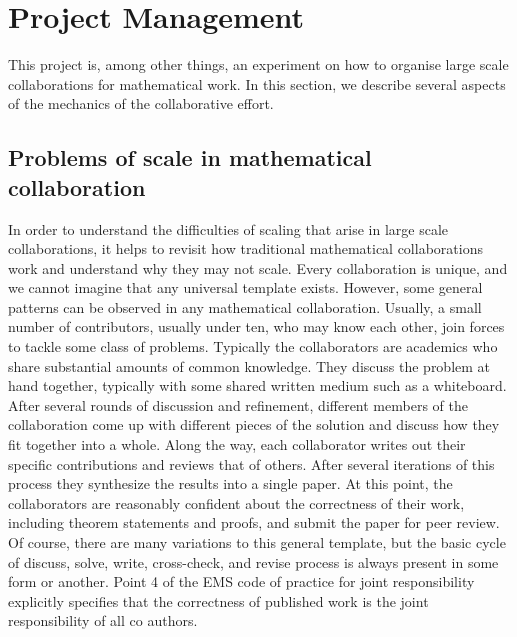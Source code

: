 \section{Project Management}\label{project-sec}


This project is, among other things, an experiment on how to organise large scale collaborations for mathematical work. In this section, we describe several aspects of the mechanics of the collaborative effort.

\subsection{Problems of scale in mathematical collaboration}
In order to understand the difficulties of scaling that arise in large scale collaborations, it helps to revisit how traditional mathematical collaborations work and understand why they may not scale. Every collaboration is unique, and we cannot imagine that any universal template exists. However, some general patterns can be observed in any mathematical collaboration. Usually, a small number of contributors, usually under ten, who may know each other, join forces to tackle some class of problems. Typically the collaborators are academics who share substantial amounts of common knowledge. They discuss the problem at hand together, typically with some shared written medium such as a whiteboard. After several rounds of discussion and refinement, different members of the collaboration come up with different pieces of the solution and discuss how they fit together into a whole. Along the way, each collaborator writes out their specific contributions and reviews that of others. After several iterations of this process they synthesize the results into a single paper. At this point, the collaborators are reasonably confident about the correctness of their work, including theorem statements and proofs, and submit the paper for peer review. Of course, there are many variations to this general template, but the basic cycle of discuss, solve, write, cross-check, and revise process is always present in some form or another. Point 4 of the EMS code of practice for joint responsibility \cite{EMS_code_of_practice} explicitly specifies that the correctness of published work is the joint responsibility of all co authors.


